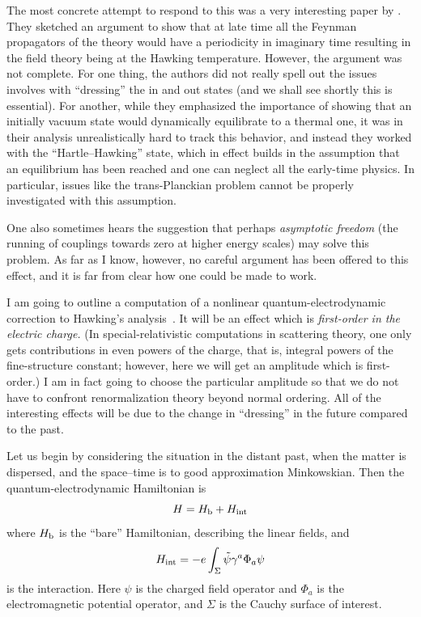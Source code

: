 \documentclass[
%
draft    %
,numberedheadings 
,bibliocites
  ]
  {aipproc}
\begin{document}
The most concrete attempt to respond to this was a very interesting paper by \citet{Gibbons:1976es}.  They sketched an argument to show that at late time all the Feynman propagators of the theory would have  a periodicity in imaginary time resulting in the field theory being at the Hawking temperature.  However, the argument was not complete.  For one thing, the authors did not really spell out the issues involves with ``dressing'' the in and out states (and we shall see shortly this is essential).  For another, while they emphasized the importance of showing that an initially vacuum state would dynamically equilibrate to a thermal one, it was in their analysis unrealistically hard to track this behavior, and instead they worked with the ``Hartle--Hawking'' state, which in effect builds in the assumption that an equilibrium has been reached and one can neglect all the early-time physics.  In particular, issues like the trans-Planckian problem cannot be properly investigated with this assumption.

One also sometimes hears the suggestion that perhaps {\em asymptotic freedom} (the running of couplings towards zero at higher energy scales) may solve this problem.  As far as I know, however, no careful argument has been offered to this effect, and it is far from clear how one could be made to work.

I am going to outline a computation of a nonlinear quantum-electrodynamic correction to Hawking's analysis~\citep{Helfer:2005wy,Helfer:2005wz}.  It will be an effect which is 
{\em first-order in the electric charge.}  (In special-relativistic computations in scattering theory, one only gets contributions in even powers of the charge, that is, integral powers of the fine-structure constant; however, here we will get an amplitude which is first-order.)  I am in fact going to choose the particular amplitude so that we do not have to confront renormalization theory beyond normal ordering.  All of the interesting effects will be due to the change in ``dressing'' in the future compared to the past.

Let us begin by considering the situation in the distant past, when the matter is dispersed, and the space--time is to good approximation Minkowskian.  Then the quantum-electrodynamic Hamiltonian is
\begin{equation}
H=H_{\rm b}+H_{\rm int}
\end{equation}
where $H_{\rm b}$ is the ``bare'' Hamiltonian, describing the linear fields, and
\begin{equation}
  H_{\rm int}=-e\int _\Sigma \tilde\psi \gamma ^a\Phi _a\psi
\end{equation} 
is the interaction.  Here $\psi$ is the charged field operator and $\Phi _a$ is the electromagnetic potential operator, and $\Sigma$ is the Cauchy surface of interest.
\end{document}
